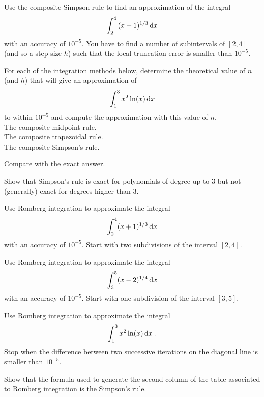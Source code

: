 \begin{question}
Use the composite Simpson rule to find an approximation of the
integral
\[
\int_2^4\, (x+1)^{1/3} \,\mathrm{d}x
\]
with an accuracy of $10^{-5}$.  You have to find a number of
subintervals of $[2,4]$ (and so a step size $h$) such that the local
truncation error is smaller than $10^{-5}$.
\label{diffQ8}
\end{question}

\begin{question}
For each of the integration methods below, determine the theoretical
value of $n$ (and $h$) that will give an approximation of
\[
\int_1^3 x^2 \ln(x) \,\mathrm{d}x
\]
to within $10^{-5}$ and compute the approximation with this value of
$n$.\\
 The composite midpoint rule.\\
 The composite trapezoidal rule.\\
 The composite Simpson's rule.

Compare with the exact answer.
\label{diffQ9}
\end{question}

\begin{question}
Show that Simpson's rule is exact for polynomials of degree up to
$3$ but not (generally) exact for degrees higher than $3$.
\label{diffQ10}
\end{question}

\begin{question}
Use Romberg integration to approximate the integral
\[
\int_2^4 (x+1)^{1/3} \,\mathrm{d}x
\]
with an accuracy of $10^{-5}$.  Start with two subdivisions of the
interval $[2,4]$.
\label{diffQ11}
\end{question}

\begin{question}
Use Romberg integration to approximate the integral
\[
\int_3^5 (x-2)^{1/4} \,\mathrm{d}x
\]
with an accuracy of $10^{-5}$.  Start with one subdivision of the
interval $[3,5]$.
\label{diffQ12}
\end{question}

\begin{question}
Use Romberg integration to approximate the integral
\[
\int_1^3 x^2 \ln(x) \,\mathrm{d}x \ .
\]
Stop when the difference between two successive iterations on the
diagonal line is smaller than $10^{-5}$.
\label{diffQ13}
\end{question}

\begin{question}
Show that the formula used to generate the second column of the table
associated to Romberg integration is the Simpson's rule.
\label{diffQ14}
\end{question}

